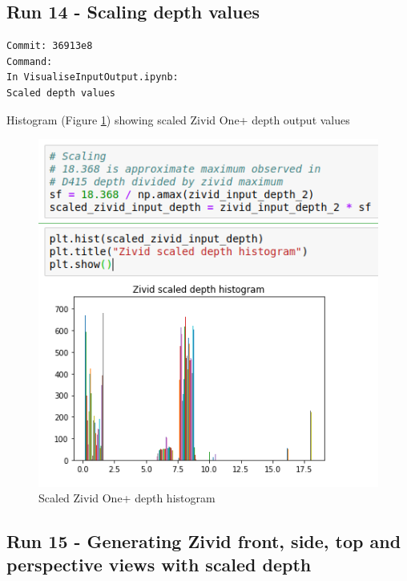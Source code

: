 \subsection{Run 14 - Scaling depth values}
\label{app_res:14}

\label{app_res:10}
\begin{verbatim}
Commit: 36913e8
Command: 
In VisualiseInputOutput.ipynb:
Scaled depth values 
\end{verbatim}

Histogram (Figure \ref{fig:ScaledZividHistogram})  showing scaled Zivid One+ depth output values

\begin{figure}[h!]
\centering
\includegraphics[width=\textwidth]{Figures/ScaledZividHistogram.png}
\caption{Scaled Zivid One+ depth histogram}
\label{fig:ScaledZividHistogram}
\end{figure}

\subsection{Run 15 - Generating Zivid front, side, top and perspective views with scaled depth}
\label{app_res:15}

